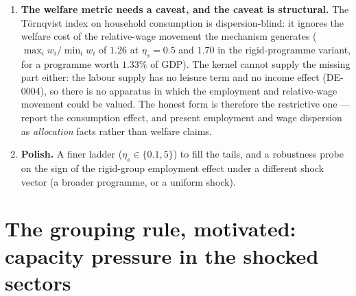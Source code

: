 \documentclass[11pt]{article}
\begin{document}
\begin{enumerate}
      whether the mechanism is a headline or a robustness remark: if the
      technology shock dominates the price response, the sectoral channel's
      contribution shrinks; if the two add up, the mechanism is a first-order
      part of the story. This is one probe and one design. Run since
      (\texttt{probe15\_sectoral\_supply.jl}), and the answer is mixed but
      informative: under a $+20\%$ shock in sector 1 the rungs \emph{separate}
      (employment $1.000000$, $1.002187$, $1.008218$ and the real-wage spread
      $1.215$, $1.105$, $1.043$ at $\eta_s = 0, 0.5, 2$), so the elasticity is
      identifiable there --- but the shock roughly doubles the price response
      and flips the sign of the welfare effect (supply-only $+1.20\%$, supply
      $+$ programme $-0.40\%$, demand-only $-1.57\%$), so the two channels do
      not add linearly and the technology shock dominates the price movement.
      One precision must travel with any supply-arm table: under a supply shock
      $\max|p-1|$ is not a demand-sensitivity measure (the shock alone moves
      prices by $0.226$ with no programme), so the demand channel is read from
      the F1/F2/F3 differences. A supply-shock \emph{design} (ADR-0018's schema
      item) is still owed.
\item \textbf{The welfare metric needs a caveat, and the caveat is structural.}
      The T\"ornqvist index on household consumption is dispersion-blind: it
      ignores the welfare cost of the relative-wage movement the mechanism
      generates ($\max_i w_i/\min_i w_i$ of $1.26$ at $\eta_s = 0.5$ and $1.70$
      in the rigid-programme variant, for a programme worth $1.33\%$ of GDP).
      The kernel cannot supply the missing part either: the labour supply has no
      leisure term and no income effect (DE-0004), so there is no apparatus in
      which the employment and relative-wage movement could be valued. The
      honest form is therefore the restrictive one --- report the consumption
      effect, and present employment and wage dispersion as \emph{allocation}
      facts rather than welfare claims.
\item \textbf{Polish.} A finer ladder ($\eta_s \in \{0.1, 5\}$) to fill the
      tails, and a robustness probe on the sign of the rigid-group employment
      effect under a different shock vector (a broader programme, or a uniform
      shock).
\end{enumerate}

\section{The grouping rule, motivated: capacity pressure in the shocked sectors}\label{sec:capacity}
\end{document}
